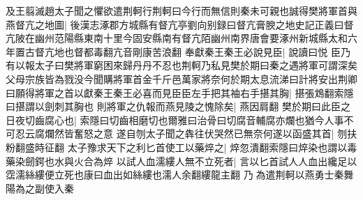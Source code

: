 及王翦滅趙太子聞之懼欲遣荆軻行荆軻曰今行而無信則秦未可親也誠得樊將軍首與燕督亢之地圖|{
	後漢志涿郡方城縣有督亢亭劉向别録曰督亢膏腴之地史記正義曰督亢陂在幽州范陽縣東南十里今固安縣南有督亢陌幽州南界唐會要涿州新城縣太和六年置古督亢地也督都毒翻亢音剛康苦浪翻}
奉獻秦王秦王必說見臣|{
	說讀曰悦}
臣乃有以報太子曰樊將軍窮困來歸丹丹不忍也荆軻乃私見樊於期曰秦之遇將軍可謂深矣父母宗族皆為戮没今聞購將軍首金千斤邑萬家將奈何於期太息流涕曰計將安出荆卿曰願得將軍之首以獻秦王秦王必喜而見臣臣左手把其袖右手揕其胸|{
	揕張鴆翻索隱曰揕謂以劍刺其胸也}
則將軍之仇報而燕見陵之愧除矣|{
	燕因肩翻}
樊於期曰此臣之日夜切齒腐心也|{
	索隱曰切齒相磨切也爾雅曰治骨曰切腐音輔腐亦爛也猶今人事不可忍云腐爛然皆奮怒之意}
遂自刎太子聞之犇往伏哭然已無奈何遂以函盛其首|{
	刎扶粉翻盛時征翻}
太子豫求天下之利匕首使工以藥焠之|{
	焠忽潰翻索隱曰焠染也謂以毒藥染劒鍔也水與火合為焠}
以試人血濡縷人無不立死者|{
	言以匕首試人人血出纔足以霑濡絲縷便立死也康曰血出如絲縷也濡人余翻縷龍主翻}
乃為遣荆軻以燕勇士秦舞陽為之副使入秦

